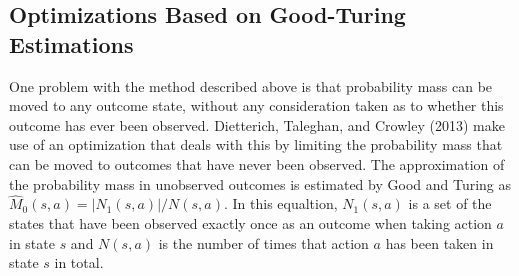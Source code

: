 \subsection{Optimizations Based on Good-Turing Estimations }
\label{sec:mbie_gt}

One problem with the method described above is that probability mass can be moved to any outcome state, without any consideration taken as to whether this outcome has ever been observed. Dietterich, Taleghan, and Crowley (2013)  make use of an optimization that deals with this by limiting the probability mass that can be moved to outcomes that have never been observed. The approximation of the probability mass in unobserved outcomes is estimated by Good and Turing as $\hat{M}_0(s,a) = |N_1(s,a)| / N(s,a)$. \parencite{gtpaper} In this equaltion, $N_1(s,a)$ is a set of the states that have been observed exactly once as an outcome when taking action $a$ in state $s$ and $N(s,a)$ is the number of times that action $a$ has been taken in state $s$ in total.